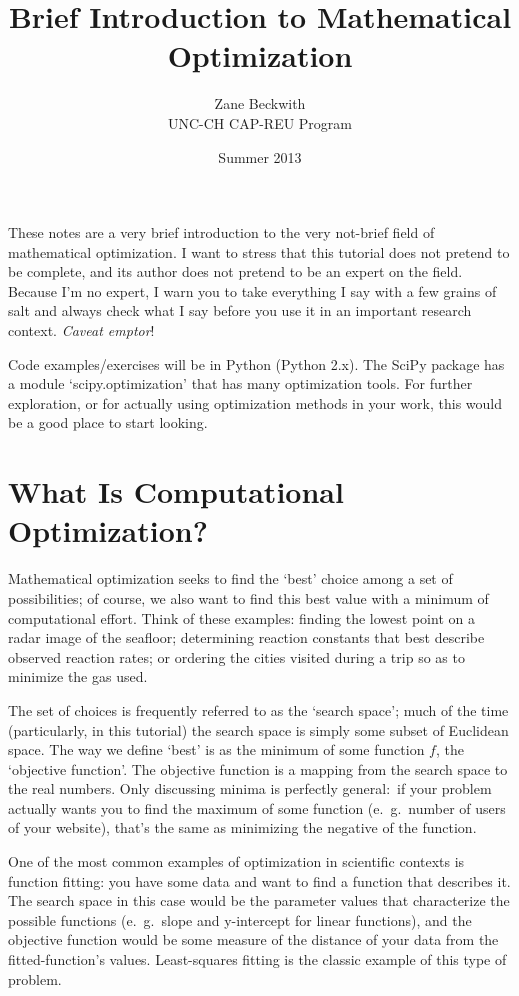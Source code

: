 \documentclass{article}
\begin{document}
\title{Brief Introduction to Mathematical Optimization}
\author{Zane Beckwith \\
UNC-CH CAP-REU Program}
\date{Summer 2013}
\maketitle

These notes are a very brief introduction to the very not-brief field of 
mathematical optimization. I want to stress that this tutorial does not
pretend to be complete, and its author does not pretend to be an expert
on the field. Because I'm no expert, I warn you to take everything I say
with a few grains of salt and always check what I say before you use
it in an important research context. \textit{Caveat emptor}!

Code examples/exercises will be in Python (Python 2.x). The SciPy package
has a module `scipy.optimization' that has many optimization tools. For further
exploration, or for actually using optimization methods in your work, 
this would be a good place to start looking.

\section*{What Is Computational Optimization?}
	Mathematical optimization seeks to find the `best' choice among
	a set of possibilities; of course, we also want to find this best
	value with a minimum of computational effort. 
	Think of these examples: finding the lowest point on a radar image
	of the seafloor; determining reaction constants that best describe
	observed reaction rates; or ordering the cities visited during a trip
	so as to minimize the gas used.

	The set of choices is frequently referred
	to as the `search space'; much of the time (particularly, in this tutorial)
	the search space is simply some subset of Euclidean space.
	The way we define `best' is as the minimum of some function $f$,
	the `objective function'. The objective function is a mapping
	from the search space to the real numbers. Only discussing minima
	is perfectly general:\ if your problem actually
	wants you to find the maximum of some function (e.\ g.\ number of users
	of your website), that's the same as minimizing the negative of the function.

	One of the most common examples of optimization in scientific contexts
	is function fitting: you have some data and want to find a function that
	describes it. The search space in this case would be the parameter values
	that characterize the possible functions 
	(e.\ g.\ slope and y-intercept for linear functions), 
	and the objective function
	would be some measure of the distance of your data from
	the fitted-function's values.
	Least-squares fitting is the classic example of this type of problem.
\end{document}
